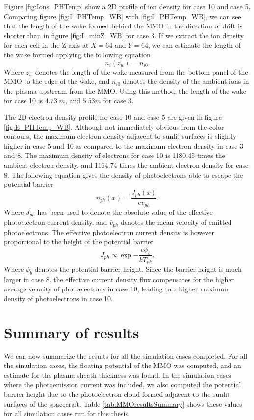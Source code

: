 Figure \ref{fig:Ions_PHTemp} show a 2D profile of ion density for case 10 and case 5. Comparing figure \ref{fig:I_PHTemp_WB} with \ref{fig:I_PHTemp_WB}, we can see that the length of the wake formed behind the MMO in the direction of drift is shorter than in figure \ref{fig:I_minZ_WB} for case 3. If we extract the ion density for each cell in the Z axis at $X = 64$ and $Y = 64$, we can estimate the length of the wake formed applying the following equation
\begin{equation}
    n_i(z_w) = n_{i0}.
\end{equation}
Where $z_w$ denotes the length of the wake measured from the bottom panel of the MMO to the edge of the wake, and $n_{i0}$ denotes the density of the ambient ions in the plasma upstream from the MMO. Using this method, the length of the wake for case 10 is $4.73 \; m$, and $5.53 m$ for case 3.

The 2D electron density profile for case 10 and case 5 are given in figure \ref{fig:E_PHTemp_WB}. Although not immediately obvious from the color contours, the maximum electron density adjacent to sunlit surfaces is slightly higher in case 5 and 10 as compared to the maximum electron density in case 3 and 8. The maximum density of electrons for case 10 is 1180.45 times the ambient electron density, and 1164.74 times the ambient electron density for case 8. The following equation gives the density of photoelectrons able to escape the potential barrier \parencite{Zhao1996}
\begin{equation}
    n_{ph}(x) = \frac{J_{ph}(x)}{e \overline{v}_{ph}}.
\end{equation}
Where $J_{ph}$ has been used to denote the absolute value of the effective photoelectron current density, and $\overline{v}_{ph}$ denotes the mean velocity of emitted photoelectrons. The effective photoelectron current density is however proportional to the height of the potential barrier \parencite{Zhao1996}
\begin{equation}
    J_{ph} \propto \exp{- \frac{e \phi_b}{k T_{ph}}}.
\end{equation}
Where $\phi_b$ denotes the potential barrier height. Since the barrier height is much larger in case 8, the effective current density flux compensates for the higher average velocity of photoelectrons in case 10, leading to a higher maximum density of photoelectrons in case 10.

\section{Summary of results}
We can now summarize the results for all the simulation cases completed. For all the simulation cases, the floating potential of the MMO was computed, and an estimate for the plasma sheath thickness was found. In the simulation cases where the photoemission current was included, we also computed the potential barrier height due to the photoelectron cloud formed adjacent to the sunlit surfaces of the spacecraft. Table \ref{tab:MMOresultsSummary} shows these values for all simulation cases run for this thesis.

